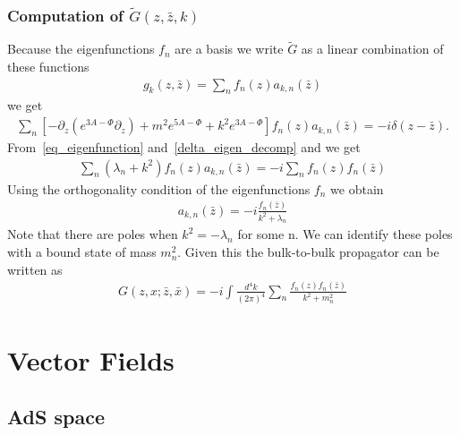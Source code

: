 \documentclass[12pt,a4paper]{article}
\begin{document}
\subsubsection{Computation of $\tilde{G}\left(z,\bar{z},k\right)$}

Because the eigenfunctions $f_n$ are a basis we write $\tilde{G}$ as a linear combination of these functions
\begin{align}
    g_k\left(z,\bar{z}\right) = \sum_n f_n\left(z\right) a_{k,n} \left(\bar{z}\right)
\end{align}
we get
\begin{align}
    \sum_n\left[- \partial_z \left( e^{3 A - \Phi} \partial_z \right) + m^2 e^{5 A - \Phi} + k^2 e^{3 A - \Phi} \right] f_n\left(z\right) a_{k,n} \left(\bar{z}\right) = - i \delta \left( z -\bar{z} \right).
 \end{align}
From~\ref{eq_eigenfunction} and~\ref{delta_eigen_decomp} and  we get
\begin{align}
    \sum_n \left(\lambda_n + k^2 \right) f_n\left(z\right) a_{k,n} \left(\bar{z}\right) = - i \sum_n f_n \left(z \right) f_n \left(\bar{z}\right)
 \end{align}
Using the orthogonality condition of the eigenfunctions $f_n$ we obtain
\begin{align}
    a_{k,n}\left(\bar{z}\right) = -i \frac{f_n\left(\bar{z}\right)}{k^2 + \lambda_n }
\end{align}
Note that there are poles when $k^2 = - \lambda_n$ for some n. We can identify these poles with a bound state of mass $m_n^2$. Given this the bulk-to-bulk propagator can be written as
\begin{align}
    G \left(z, x ; \bar{z}, \bar{x} \right) = - i \int \frac{d^4 k}{\left(2 \pi \right)^4} \sum_n \frac{f_n \left(z\right)f_n \left(\bar{z}\right)}{k^2 + m_n ^2 }
\end{align}
\section{Vector Fields}

\subsection{AdS space}
\end{document}
